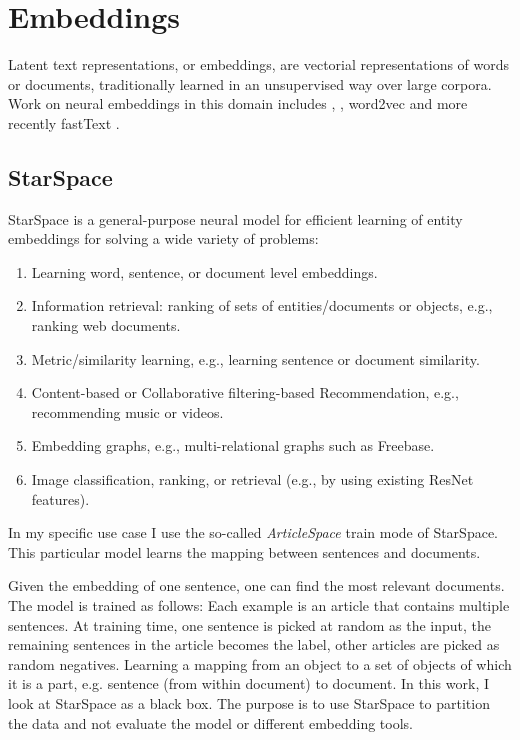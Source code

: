 \section{Embeddings}
\label{Embeddigns}
Latent text representations, or embeddings, are vectorial representations of words or documents, traditionally learned in an unsupervised way over large corpora. Work on neural embeddings in this domain includes \cite{Bengio2003}, 
\cite{Collobert2011}, word2vec \cite{goldberg2014word2vec} and more recently fastText \cite{joulin2016fasttext}.

\subsection{StarSpace}
\label{StarSpace}
StarSpace \cite{StarSpace} is a general-purpose neural model for efficient learning of entity embeddings for solving a wide variety of problems:

\begin{enumerate}
	\item Learning word, sentence, or document level embeddings.
	\item Information retrieval: ranking of sets of entities/documents or objects, e.g., ranking web documents.
	\item Metric/similarity learning, e.g., learning sentence or document similarity.
	\item Content-based or Collaborative filtering-based Recommendation, e.g., recommending music or videos.
	\item Embedding graphs, e.g., multi-relational graphs such as Freebase.
	\item Image classification, ranking, or retrieval (e.g., by using existing ResNet features).
\end{enumerate}

In my specific use case I use the so-called \emph{ArticleSpace} train mode of StarSpace. 
This particular model learns the mapping between sentences and documents.

Given the embedding of one sentence, one can find the most relevant documents. 
The model is trained as follows: Each example is an article that contains multiple sentences. At training time, one sentence is picked at random as the input, the remaining sentences in the article becomes the label, other articles are picked as random negatives.
Learning a mapping from an object to a set of objects of which it is a part, e.g. sentence (from within document) to document.
In this work, I look at StarSpace as a black box. The purpose is to use StarSpace to partition the data and not evaluate the model or different embedding tools.
